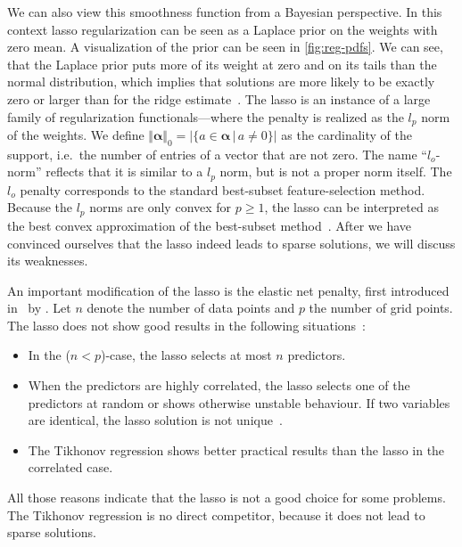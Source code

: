 We can also view this smoothness function from a Bayesian perspective.
In this context lasso regularization can be seen as a Laplace prior on the
weights with zero mean.
A visualization of the prior can be seen in \cref{fig:reg-pdfs}.
We can see, that the Laplace prior puts more of its weight at zero and on its
tails than the normal distribution, which implies that solutions are more likely
to be exactly zero or larger than for the ridge estimate~\cite{lasso}.
The lasso is an instance of a large family of regularization functionals---where the penalty is realized as the \(l_p\) norm of the weights.
We define \(\Vert \bm{\alpha} \Vert_0 = \vert \{a \in \bm{\alpha} \, | \, a \neq 0\} \vert\) as the cardinality of the support, i.e.~the number of entries of a vector that are not zero.
The name ``\(l_o\)-norm'' reflects that it is similar to a \(l_p\) norm, but is
not a proper norm itself.
The \(l_o\) penalty corresponds to the standard best-subset feature-selection method.
Because the \(l_p\) norms are only convex for \(p \geq 1\), the lasso can be interpreted as the best convex approximation of the best-subset method~\cite{sparse-learning,lasso}.
After we have convinced ourselves that the lasso indeed leads to sparse
solutions, we will discuss its weaknesses.

An important modification of the lasso is the elastic net penalty, first introduced in~\cite{elasticnet} by \citeauthor{elasticnet}.
Let \(n\) denote the number of data points and \(p\) the number of grid points. The lasso does not show good results in the following situations~\cite{elasticnet}:
\begin{itemize}
\item In the (\(n < p\))-case, the lasso selects at most \(n\) predictors.
\item When the predictors are highly correlated, the lasso selects one of the
  predictors at random or shows otherwise unstable behaviour.
  If two variables are identical, the lasso solution is not unique~\cite{sparse-learning}.
\item The Tikhonov regression shows better practical results than the lasso in the
  correlated case.
\end{itemize}
All those reasons indicate that the lasso is not a good choice for some problems.
The Tikhonov regression is no direct competitor, because it does not lead to
sparse solutions.

